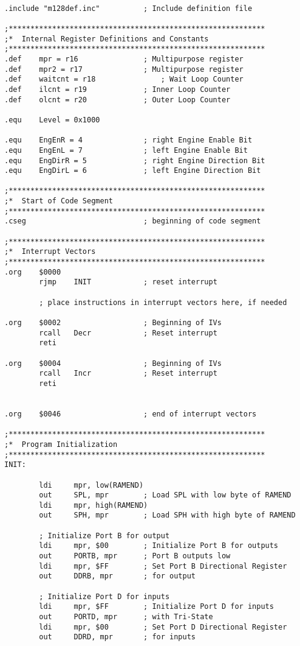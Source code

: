 \documentclass[12pt,letterpaper]{article}
\begin{document}
\begin{verbatim}

.include "m128def.inc"			; Include definition file

;***********************************************************
;*	Internal Register Definitions and Constants
;***********************************************************
.def	mpr = r16				; Multipurpose register
.def	mpr2 = r17				; Multipurpose register
.def	waitcnt = r18				; Wait Loop Counter
.def	ilcnt = r19				; Inner Loop Counter
.def	olcnt = r20				; Outer Loop Counter

.equ	Level = 0x1000

.equ	EngEnR = 4				; right Engine Enable Bit
.equ	EngEnL = 7				; left Engine Enable Bit
.equ	EngDirR = 5				; right Engine Direction Bit
.equ	EngDirL = 6				; left Engine Direction Bit

;***********************************************************
;*	Start of Code Segment
;***********************************************************
.cseg							; beginning of code segment

;***********************************************************
;*	Interrupt Vectors
;***********************************************************
.org	$0000
		rjmp	INIT			; reset interrupt

		; place instructions in interrupt vectors here, if needed

.org	$0002					; Beginning of IVs
		rcall 	Decr			; Reset interrupt
		reti

.org	$0004					; Beginning of IVs
		rcall 	Incr			; Reset interrupt
		reti


.org	$0046					; end of interrupt vectors

;***********************************************************
;*	Program Initialization
;***********************************************************
INIT:

		ldi		mpr, low(RAMEND)
		out		SPL, mpr		; Load SPL with low byte of RAMEND
		ldi		mpr, high(RAMEND)
		out		SPH, mpr		; Load SPH with high byte of RAMEND

		; Initialize Port B for output
		ldi		mpr, $00		; Initialize Port B for outputs
		out		PORTB, mpr		; Port B outputs low
		ldi		mpr, $FF		; Set Port B Directional Register
		out		DDRB, mpr		; for output

		; Initialize Port D for inputs
		ldi		mpr, $FF		; Initialize Port D for inputs
		out		PORTD, mpr		; with Tri-State
		ldi		mpr, $00		; Set Port D Directional Register
		out		DDRD, mpr		; for inputs


\end{verbatim}
\end{document}
